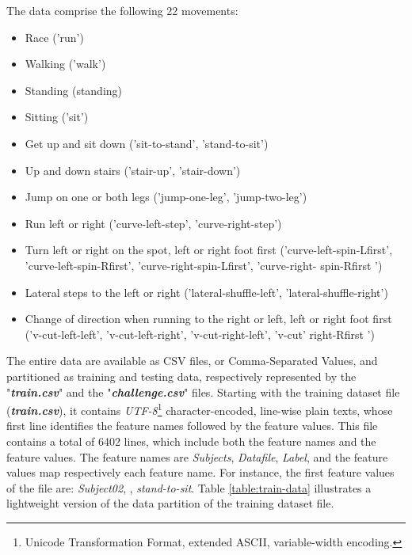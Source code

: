 The data comprise the following 22 movements:
\begin{itemize}
    \item Race ('run')
    \item Walking ('walk')
    \item Standing (standing)
    \item Sitting ('sit')
    \item Get up and sit down ('sit-to-stand', 'stand-to-sit')
    \item Up and down stairs ('stair-up', 'stair-down')
    \item Jump on one or both legs ('jump-one-leg', 'jump-two-leg')
    \item Run left or right ('curve-left-step', 'curve-right-step')
    \item Turn left or right on the spot, left or right foot first ('curve-left-spin-Lfirst',
    'curve-left-spin-Rfirst', 'curve-right-spin-Lfirst', 'curve-right- spin-Rfirst ')
    \item Lateral steps to the left or right ('lateral-shuffle-left', 'lateral-shuffle-right')
    \item Change of direction when running to the right or left, left or right foot first
    ('v-cut-left-left', 'v-cut-left-right', 'v-cut-right-left', 'v-cut' right-Rfirst ')
\end{itemize}

The entire data are available as CSV files, or Comma-Separated Values, and partitioned as training and
testing data, respectively represented by the "\textbf{\emph{train.csv}}" and the "\textbf{\emph{challenge.csv}}"
files. Starting with the training dataset file (\textbf{\emph{train.csv}}), it contains
\emph{UTF-8}\footnote{Unicode Transformation Format, extended ASCII, variable-width encoding.}
character-encoded, line-wise plain texts, whose first line identifies the feature names
followed by the feature values. This file contains a total of 6402 lines, which include both the
feature names and the feature values. The feature names are \textit{Subjects}, \textit{Datafile}, \textit{Label},
and the feature values map respectively each feature name. For instance, the first feature values of
the file are: \textit{Subject02}, \textit{ },
\textit{stand-to-sit}. Table \ref{table:train-data} illustrates a lightweight version of the
data partition of the training dataset file.

